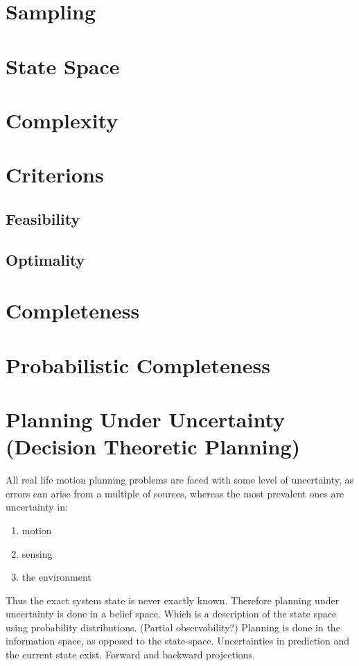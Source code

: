 \section{Sampling}

\section{State Space}

\section{Complexity}

\section{Criterions}

\subsection{Feasibility}
\subsection{Optimality}

\section{Completeness}

\section{Probabilistic Completeness}

\section{Planning Under Uncertainty (Decision Theoretic Planning)}

All real life motion planning problems are faced with some level of uncertainty,
as errors can arise from a multiple of sources, whereas the most prevalent ones
are uncertainty in:
\begin{enumerate}
\item motion
\item sensing
\item the environment
\end{enumerate}
Thus the exact system state is never exactly known. Therefore planning under
uncertainty is done in a belief space. Which is a description of the state space
using probability distributions. (Partial observability?) Planning is done in
the information space, as opposed to the state-space. Uncertainties in
prediction and the current state exist. Forward and backward projections.

